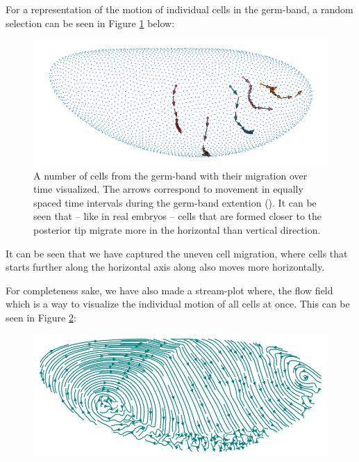 For a representation of the motion of individual cells in the germ-band, a random selection can be seen in Figure \ref{fig:GBMovements} below:
\begin{figure}[H]
    \centering
    \includegraphics[width=1\linewidth]{chapters/Results/figures/movements.png}
    \caption{A number of cells from the germ-band with their migration over time visualized. The arrows correspond to movement in equally spaced time intervals during the germ-band extention ().
    It can be seen that -- like in real embryos -- cells that are formed closer to the posterior tip migrate more in the horizontal than vertical direction.}
    \label{fig:GBMovements}
\end{figure}

It can be seen that we have captured the uneven cell migration, where cells that starts further along the horizontal axis along also moves more horizontally. 

For completeness sake, we have also made a stream-plot where, the flow field which is a way to visualize the individual motion of all cells at once. This can be seen in Figure \ref{fig:streamplot}:


\begin{figure}[H]
    \centering
    \includegraphics[width=1\linewidth]{chapters/Results/figures/streamplot2.png}
    \caption{}
    \label{fig:streamplot}
\end{figure}

